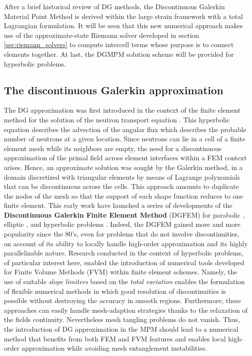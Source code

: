 After a brief historical review of DG methods, the Discontinuous Galerkin Material Point Method is derived within the large strain framework with a total Lagrangian formulation.
It will be seen that this new numerical approach makes use of the approximate-state Riemann solver developed in section \ref{sec:riemann_solvers} to compute intercell terms whose purpose is to connect elements together.
At last, the DGMPM solution scheme will be provided for hyperbolic problems.

\subsection{The discontinuous Galerkin approximation}
The DG approximation was first introduced in the context of the finite element method for the solution of the neutron transport equation \cite{NeutronDG}.
This hyperbolic equation describes the advection of the angular flux which describes the probable number of neutrons at a given location.
Since neutrons can lie in a cell of a finite element mesh while its neighbors are empty, the need for a discontinuous approximation of the primal field across element interfaces within a FEM context arises. %
Hence, an approximate solution was sought by the Galerkin method, in a domain discretized with triangular elements by means of Lagrange polynomials that can be discontinuous across the cells. This approach amounts to duplicate the nodes of the mesh so that the support of each shape function reduces to one finite element. This early work have launched a series of developments of the \textbf{Discontinuous Galerkin Finite Element Method} (DGFEM) for parabolic \cite{Arnold_IPM}, elliptic \cite{Hansbo_DGsolid,Noel_HEDG}, and hyperbolic problems \cite{Cockburn,FVilar_DG}. Indeed, the DGFEM gained more and more popularity since the 80's, even for problems that do not involve discontinuities, on account of its ability to locally handle high-order approximation and its highly parallelizable nature. 
Research conducted in the context of hyperbolic problems, of particular interest here, enabled the introduction of numerical tools developed for Finite Volume Methods (FVM) within finite element schemes.
Namely, the use of suitable \textit{slope limiters} \cite{vanLeer_Limiters} based on the \textit{total variation} \cite{Harten} enables the formulation of flexible numerical methods in which good resolution of discontinuities is possible without destroying the accuracy in smooth regions. Furthermore, these approaches can easily handle mesh-adaption strategies thanks to the relaxation of the fields continuity. Nevertheless mesh tangling problems do not vanish.
Thus, the introduction of DG approximation in the MPM should lead to a numerical method that benefits from both FEM and FVM features and enables local high-order approximation while avoiding mesh entanglement instabilities.



